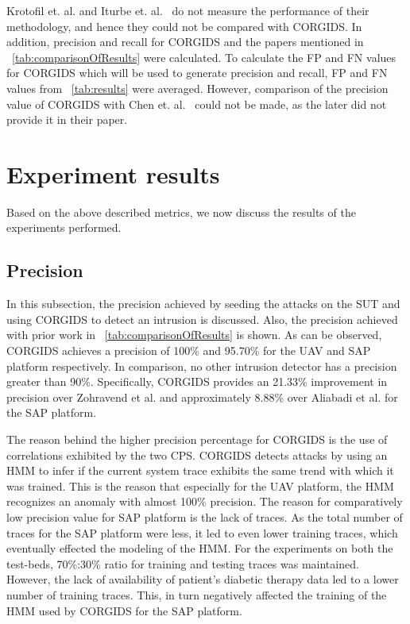 Krotofil et. al. and Iturbe et. al.~\cite{krotofil2015process,iturbe2017feasibility} do not measure the performance of their methodology, and hence they could not be compared with \ac{CORGIDS}. In addition, precision and recall for \ac{CORGIDS} and the papers mentioned in ~\autoref{tab:comparisonOfResults} were calculated. To calculate the \ac{FP} and \ac{FN} values for \ac{CORGIDS} which will be used to generate precision and recall, \ac{FP} and \ac{FN} values from ~\autoref{tab:results} were averaged. However, comparison of the precision value of \ac{CORGIDS} with Chen et. al.~\cite{chen2018learning} could not be made, as the later did not provide it in their paper.  

\section{Experiment results} 
Based on the above described metrics, we now discuss the results of the experiments performed.

\subsection{Precision}
In this subsection, the precision achieved by seeding the attacks on the \ac{SUT} and using \ac{CORGIDS} to detect an intrusion is discussed. Also,  the precision achieved with prior work in  ~\autoref{tab:comparisonOfResults} is shown. As can be observed, \ac{CORGIDS} achieves a precision of 100\% and 95.70\% for the \ac{UAV} and \ac{SAP} platform respectively. In comparison, no other intrusion detector has a precision greater than 90\%. Specifically, \ac{CORGIDS} provides an 21.33\% improvement in precision over Zohravend et al. \cite{zohrevand2016hidden} and approximately 8.88\% over Aliabadi et al. \cite{aliabadi2017artinali} for the \ac{SAP} platform.

The reason behind the higher precision percentage for \ac{CORGIDS} is the use of correlations exhibited by the two CPS. \ac{CORGIDS} detects attacks by using an \ac{HMM} to infer if the current system trace exhibits the same trend with which it was trained. This is the reason that especially for the \ac{UAV} platform, the \ac{HMM} recognizes an anomaly with almost 100\% precision. The reason for comparatively low precision value for \ac{SAP} platform is the lack of traces. As the total number of traces for the \ac{SAP} platform were less, it led to even lower training traces, which eventually effected the modeling of the \ac{HMM}. For the experiments on both the test-beds, 70\%:30\% ratio for training and testing traces was maintained. However, the lack of availability of patient's diabetic therapy data led to a lower number of training traces. This, in turn negatively affected the training of the \ac{HMM} used by \ac{CORGIDS} for the \ac{SAP} platform.


